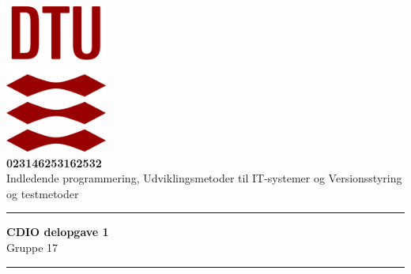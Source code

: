 


\begin{titlepage}
\begin{center}

    \includegraphics[width=0.25\textwidth]{Billeder/DTULogo.png} \\
    \vspace{0.5cm}
    \Large
    \textbf{02314\hspace{1cm}62531\hspace{1cm}62532} \\
    Indledende programmering, Udviklingsmetoder til IT-systemer og Versionsstyring og testmetoder
    \vspace{0.4cm}
    \hrule
    
    \vspace*{0.5cm}
    \huge
    \textbf{CDIO delopgave 1}\\
    \LARGE
    Gruppe 17
    \vspace{0.5cm}
    \hrule
    \vspace{0.2cm}


\end{center}
\end{titlepage}
